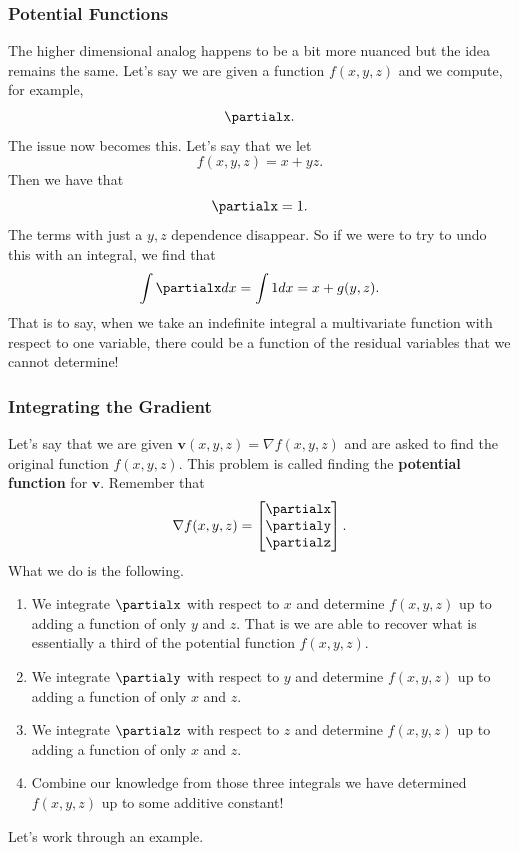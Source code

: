         \subsubsection{Potential Functions}
        The higher dimensional analog happens to be a bit more nuanced but the idea remains the same. Let's say we are given a function $f(x,y,z)$ and we compute, for example,
        \[
        \partialx.
        \]
        The issue now becomes this.  Let's say that we let
        \[
        f(x,y,z) = x+yz.
        \]
        Then we have that
        \[
        \partialx = 1.
        \]
        The terms with just a $y,z$ dependence disappear.  So if we were to try to undo this with an integral, we find that 
        \[
        \int \partialx dx = \int 1 dx = x + g(y,z).
        \]
        That is to say, when we take an indefinite integral a multivariate function with respect to one variable, there could be a function of the residual variables that we cannot determine!
        
        \subsubsection{Integrating the Gradient}
        
        Let's say that we are given $\mathbf{v}(x,y,z)=\nabla f(x,y,z)$ and are asked to find the original function $f(x,y,z)$.  This problem is called finding the \textbf{potential function} for $\mathbf{v}$.  Remember that
        \[
        \nabla f(x,y,z) = \begin{bmatrix} \partialx \\ \partialy \\ \partialz \end{bmatrix}.
        \]
        What we do is the following.
        \begin{enumerate}[1.]
            \item We integrate $\partialx$ with respect to $x$ and determine $f(x,y,z)$ up to adding a function of only $y$ and $z$.  That is we are able to recover what is essentially a third of the potential function $f(x,y,z)$.
            \item We integrate $\partialy$ with respect to $y$ and determine $f(x,y,z)$ up to adding a function of only $x$ and $z$.  
            \item We integrate $\partialz$ with respect to $z$ and determine $f(x,y,z)$ up to adding a function of only $x$ and $z$.
            \item Combine our knowledge from those three integrals we have determined $f(x,y,z)$ up to some additive constant!
        \end{enumerate}
        Let's work through an example.
        
